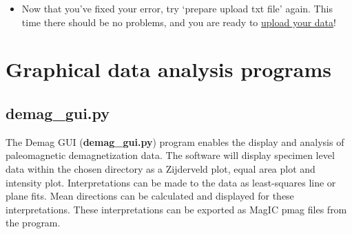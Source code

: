 \documentclass[11pt]{book}
\begin{document}
{{\begin{itemize}
    \texttt{[image: EPSFiles/MM\_validation\_mainframe.eps]}

    Open the result grid to fix the error.  Click `Show help' for more information about validations.  In this case, it is a simple fix: add method code `LP-PI' to the average V[A]DM result.

    \texttt{[image: EPSFiles/MM\_filled\_in\_result\_validation.eps]}

  \item Now that you've fixed your error, try `prepare upload txt file' again.  This time there should be no problems, and you are ready to \href{#magic_upload}{upload your data}!

\end{itemize}




%
%
%
%

\chapter{Graphical data analysis programs}
\section{demag\_gui.py}

The  Demag GUI ({\bf demag\_gui.py}) program enables the display and analysis of paleomagnetic demagnetization data. The software will display specimen level data within the chosen directory as a Zijderveld plot, equal area plot and intensity plot. Interpretations can be made to the data as least-squares line or plane fits. Mean directions can be calculated and displayed for these interpretations. These interpretations can be exported as MagIC pmag files from the program.

}}
\end{document}
